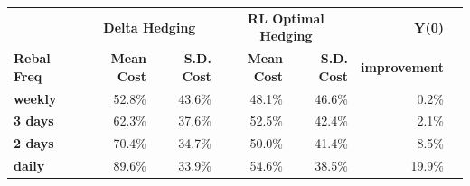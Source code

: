 \documentclass{article}
\begin{document}
\begin{table}[htbp]
\centering
\vspace{0.4em}
\begin{tabular}{lrrrrrr}
\hline
 & \multicolumn{2}{c}{\textbf{Delta Hedging}} & \multicolumn{2}{c}{\textbf{RL Optimal Hedging}} & \textbf{Y(0)} \\
\textbf{Rebal Freq} & \textbf{Mean Cost} & \textbf{S.D. Cost} & \textbf{Mean Cost} & \textbf{S.D. Cost} & \textbf{improvement} \\
\hline
\textbf{weekly} & 52.8\% & 43.6\% & 48.1\% & 46.6\% & 0.2\% \\
\textbf{3 days} & 62.3\% & 37.6\% & 52.5\% & 42.4\% & 2.1\% \\
\textbf{2 days} & 70.4\% & 34.7\% & 50.0\% & 41.4\% & 8.5\% \\
\textbf{daily} & 89.6\% & 33.9\% & 54.6\% & 38.5\% & 19.9\% \\
\hline
\end{tabular}
\end{table}
\end{document}
